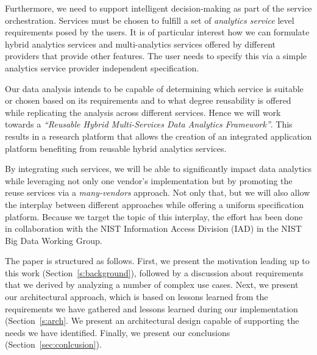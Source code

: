 Furthermore, we need to support intelligent decision-making as part of
the service orchestration. Services must be chosen to fulfill a set of
{\em analytics service} level requirements posed by the users. It is
of particular interest how we can formulate hybrid analytics services
and multi-analytics services offered by different providers that
provide other features. The user needs to specify this via a simple
analytics service provider independent specification.

Our data analysis intends to be capable of determining which service is
suitable or chosen based on its requirements and to what degree
reusability is offered while replicating the analysis across different
services. Hence we will work towards a {\em ``Reusable Hybrid
Multi-Services Data Analytics Framework''}. This results in a research
platform that allows the creation of an integrated application
platform benefiting from reusable hybrid analytics services.


By integrating such services, we will be able to significantly impact
data analytics while leveraging not only one vendor's implementation
but by promoting the reuse services via a {\em many-vendors}
approach. Not only that, but we will also allow the interplay between
different approaches while offering a uniform specification platform.
Because we target the topic of this interplay, the effort has been
done in collaboration with the NIST Information Access Division (IAD)
in the NIST Big Data Working Group.

The paper is structured as follows. First, we present the motivation
leading up to this work (Section~\ref{s:background}), followed by a
discussion about requirements that we derived by analyzing a number of
complex use cases. Next, we present our architectural approach, which is
based on lessons learned from the requirements we have gathered and
lessons learned during our implementation (Section~\ref{s:arch}. We
present an architectural design capable of supporting the needs we
have identified. Finally, we present our conclusions
(Section~\ref{sec:conlcusion}).
